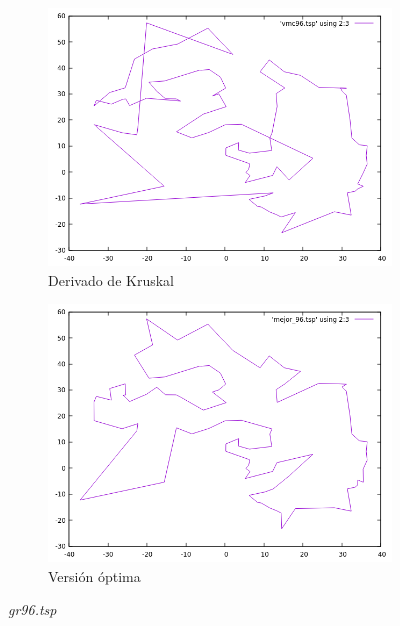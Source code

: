 \documentclass[12pt,spanish]{article}
\begin{document}
\begin{figure}[H]
\begin{subfigure}[b]{0.36\textwidth}
\includegraphics[width=\textwidth]{gr96_vmc.png}
\caption{Derivado de Kruskal}
\end{subfigure}
\quad
\begin{subfigure}[b]{0.36\textwidth}
\includegraphics[width=\textwidth]{gr96_mejor.png}
\caption{Versión óptima}
\end{subfigure}
\caption{\textit{gr96.tsp}}
\end{figure}
\end{document}
